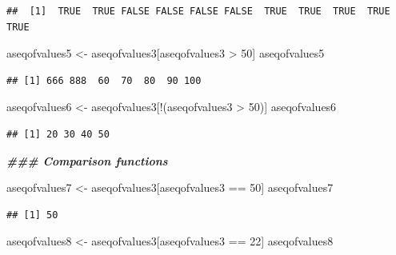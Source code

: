 \documentclass[
]{book}
\newenvironment{Shaded}{\begin{snugshade}}{\end{snugshade}}
\newcommand{\DecValTok}[1]{\textcolor[rgb]{0.00,0.00,0.81}{#1}}
\newcommand{\DocumentationTok}[1]{\textcolor[rgb]{0.56,0.35,0.01}{\textbf{\textit{#1}}}}
\newcommand{\NormalTok}[1]{#1}
\newcommand{\OtherTok}[1]{\textcolor[rgb]{0.56,0.35,0.01}{#1}}
\newcommand{\SpecialCharTok}[1]{\textcolor[rgb]{0.00,0.00,0.00}{#1}}
\begin{document}
\begin{verbatim}
##  [1]  TRUE  TRUE FALSE FALSE FALSE FALSE  TRUE  TRUE  TRUE  TRUE  TRUE
\end{verbatim}

\begin{Shaded}
\begin{Highlighting}[]
\NormalTok{aseqofvalues5 }\OtherTok{\textless{}{-}}\NormalTok{ aseqofvalues3[aseqofvalues3 }\SpecialCharTok{\textgreater{}} \DecValTok{50}\NormalTok{]}
\NormalTok{aseqofvalues5}
\end{Highlighting}
\end{Shaded}

\begin{verbatim}
## [1] 666 888  60  70  80  90 100
\end{verbatim}

\begin{Shaded}
\begin{Highlighting}[]
\NormalTok{aseqofvalues6 }\OtherTok{\textless{}{-}}\NormalTok{ aseqofvalues3[}\SpecialCharTok{!}\NormalTok{(aseqofvalues3 }\SpecialCharTok{\textgreater{}} \DecValTok{50}\NormalTok{)]}
\NormalTok{aseqofvalues6}
\end{Highlighting}
\end{Shaded}

\begin{verbatim}
## [1] 20 30 40 50
\end{verbatim}

\begin{Shaded}
\begin{Highlighting}[]
\DocumentationTok{\#\#\# Comparison functions}

\NormalTok{aseqofvalues7 }\OtherTok{\textless{}{-}}\NormalTok{ aseqofvalues3[aseqofvalues3 }\SpecialCharTok{==} \DecValTok{50}\NormalTok{]}
\NormalTok{aseqofvalues7}
\end{Highlighting}
\end{Shaded}

\begin{verbatim}
## [1] 50
\end{verbatim}

\begin{Shaded}
\begin{Highlighting}[]
\NormalTok{aseqofvalues8 }\OtherTok{\textless{}{-}}\NormalTok{ aseqofvalues3[aseqofvalues3 }\SpecialCharTok{==} \DecValTok{22}\NormalTok{]}
\NormalTok{aseqofvalues8}
\end{Highlighting}
\end{Shaded}
\end{document}
